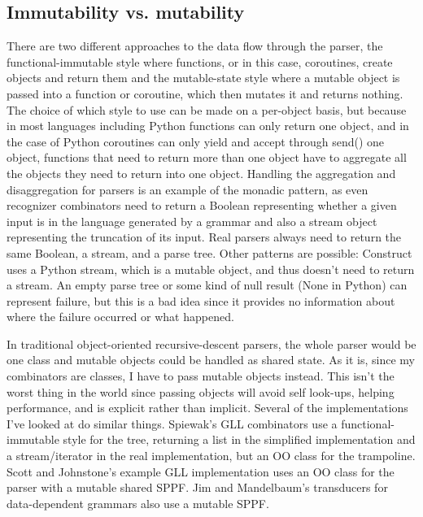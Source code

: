 \documentclass[12pt]{article}
\begin{document}
\subsection{Immutability vs. mutability}
\label{sec:immutable_mutable}

There are two different approaches to the data flow through the
parser, the functional-immutable style where functions, or in this
case, coroutines, create objects and return them and the mutable-state
style where a mutable object is passed into a function or coroutine,
which then mutates it and returns nothing.  The choice of which style
to use can be made on a per-object basis, but because in most
languages including Python functions can only return one object, and
in the case of Python coroutines can only yield and accept through
send() one object, functions that need to return more than one object
have to aggregate all the objects they need to return into one object.
Handling the aggregation and disaggregation for parsers is an example
of the monadic pattern, as even recognizer combinators need to return
a Boolean representing whether a given input is in the language
generated by a grammar and also a stream object representing the
truncation of its input.  Real parsers always need to return the same
Boolean, a stream, and a parse tree.  Other patterns are possible:
Construct uses a Python stream, which is a mutable object, and thus
doesn't need to return a stream.  An empty parse tree or some kind of
null result (None in Python) can represent failure, but this is a bad
idea since it provides no information about where the failure occurred
or what happened.

In traditional object-oriented recursive-descent parsers, the whole
parser would be one class and mutable objects could be handled as
shared state.  As it is, since my combinators are classes, I have to
pass mutable objects instead.  This isn't the worst thing in the world
since passing objects will avoid self look-ups, helping performance,
and is explicit rather than implicit.  Several of the implementations
I've looked at do similar things.  Spiewak's GLL combinators use a
functional-immutable style for the tree, returning a list in the
simplified implementation and a stream/iterator in the real
implementation, but an OO class for the trampoline.  Scott and
Johnstone's example GLL implementation uses an OO class for the parser
with a mutable shared SPPF.  Jim and Mandelbaum's transducers for
data-dependent grammars also use a mutable SPPF.
\end{document}
